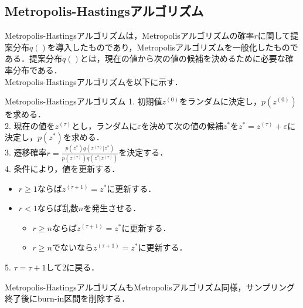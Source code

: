 \documentclass[11pt, a4paper]{jarticle}
\begin{document}
\subsection{Metropolis-Hastingsアルゴリズム}
Metropolis-Hastingsアルゴリズムは，Metropolisアルゴリズムの確率$r$に関して提案分布$q()$を導入したものであり，Metropolisアルゴリズムを一般化したものである\cite{bib5}．提案分布$q()$とは，現在の値から次の値の候補を決めるために必要な確率分布である．\\
Metropolis-Hastingsアルゴリズムを以下に示す．
\begin{itembox}[c]{Metropolis-Hastingsアルゴリズム}
  	1.  初期値$z^{(0)}$をランダムに決定し，$p(z^{(0)})$を求める． \\ 
	2.  現在の値を$z^{(\tau)}$とし，ランダムに$\varepsilon$を決めて次の値の候補$z^{*}$を$z^{*} = z^{(\tau)} + \varepsilon$に決定し，$p(z^{*})$を求める．\\
	3.  遷移確率$r	= \frac {p(z^{*})q(z^{(\tau)}|z^{*})}{p(z^{(\tau)})q(z^{*}|z^{(\tau)})}$を決定する．\\
	4. 条件により，値を更新する． 
	\begin{itemize}
		\item $r \ge 1$ならば$z^{(\tau+1)} = z^{*}$に更新する． 
		\item $r < 1$ならば乱数$n$を発生させる．
		\begin{itemize}
			\item $r \ge n$ならば$z^{(\tau+1)} = z^{*}$に更新する． 
			\item $r \ge n$でないなら$z^{(\tau+1)} = z^{*}$に更新する．
		\end{itemize}
	\end{itemize}
	5.  $\tau = \tau + 1$して2に戻る．
 \end{itembox}
 Metropolis-HastingsアルゴリズムもMetropolisアルゴリズム同様，サンプリング終了後にburn-in区間を削除する．

\end{document}
